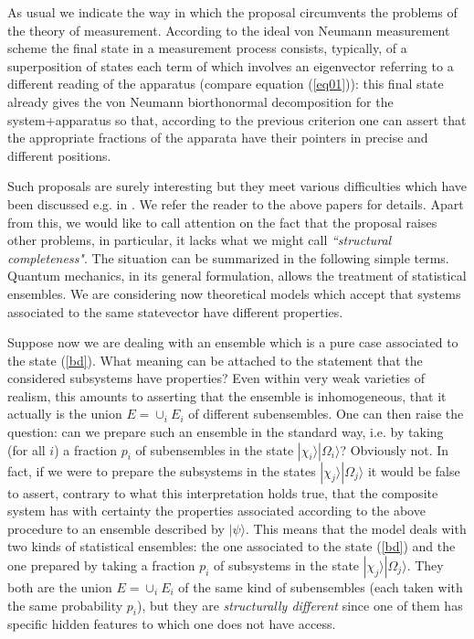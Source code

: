 \documentclass[10pt,a4paper]{article}
\begin{document}
As usual we indicate the way in which the proposal circumvents the
problems of the theory of measurement. According to the ideal von
Neumann measurement scheme the final state in a measurement
process consists, typically, of a superposition of states each
term of which involves an eigenvector referring to a different
reading of the apparatus (compare equation (\ref{eq01})): this
final state already gives the von Neumann biorthonormal
decomposition for the system+apparatus so that, according to the
previous criterion one can assert that the appropriate fractions
of the apparata have their pointers in precise and different
positions.

Such proposals are surely interesting but they meet various
difficulties which have been discussed e.g. in
\cite{blm,al2,sq1,alo1}. We refer the reader to the above papers
for details. Apart from this, we would like to call attention on
the fact that the proposal raises other problems, in particular,
it lacks what we might call {\it ``structural completeness"}. The
situation can be summarized in the following simple terms. Quantum
mechanics, in its general formulation, allows the treatment of
statistical ensembles. We are considering now theoretical models
which accept that systems associated to the same statevector have
different properties.

Suppose now we are dealing with an ensemble which is a pure case
associated to the state (\ref{bd}). What meaning can be attached
to the statement that the considered subsystems have properties?
Even within very weak varieties of realism, this amounts to
asserting that the ensemble is inhomogeneous, that it actually is
the union $E = \cup_{i} E_{i}$ of different subensembles. One can
then raise the question: can we prepare such an ensemble in the
standard way, i.e. by taking (for all $i$) a fraction $p_{i}$ of
subensembles in the state $|\chi_{i}\rangle |\Omega_{i}\rangle$?
Obviously not. In fact, if we were to prepare the subsystems in
the states $|\chi_{j}\rangle |\Omega_{j}\rangle$ it would be false
to assert, contrary to what this interpretation holds true, that
the composite system has with certainty the properties associated
according to the above procedure to an ensemble described by
$|\psi\rangle$. This means that the model deals with two kinds of
statistical ensembles: the one associated to the state (\ref{bd})
and the one prepared by taking a fraction $p_{i}$ of subsystems in
the state $|\chi_{j}\rangle |\Omega_{j}\rangle$. They both are the
union $E = \cup_{i} E_{i}$ of the same kind of subensembles (each
taken with the same probability $p_{i}$), but they are {\it
structurally different} since one of them has specific hidden
features to which one does not have access.
\end{document}
